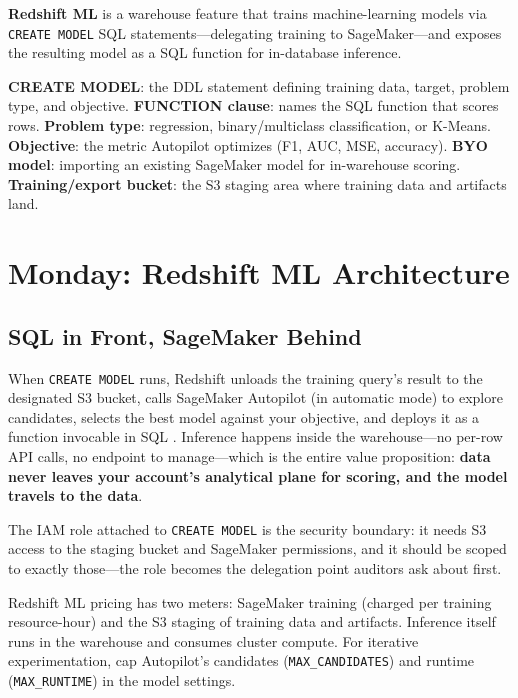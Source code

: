 \begin{definitionbox}
\textbf{Redshift ML} is a warehouse feature that trains machine-learning models via \texttt{CREATE MODEL} SQL statements---delegating training to SageMaker---and exposes the resulting model as a SQL function for in-database inference.
\end{definitionbox}

\begin{keyterms}
\textbf{CREATE MODEL}: the DDL statement defining training data, target, problem type, and objective. \textbf{FUNCTION clause}: names the SQL function that scores rows. \textbf{Problem type}: regression, binary/multiclass classification, or K-Means. \textbf{Objective}: the metric Autopilot optimizes (F1, AUC, MSE, accuracy). \textbf{BYO model}: importing an existing SageMaker model for in-warehouse scoring. \textbf{Training/export bucket}: the S3 staging area where training data and artifacts land.
\end{keyterms}

\section{Monday: Redshift ML Architecture}
\subsection{SQL in Front, SageMaker Behind}
When \texttt{CREATE MODEL} runs, Redshift unloads the training query's result to the designated S3 bucket, calls SageMaker Autopilot (in automatic mode) to explore candidates, selects the best model against your objective, and deploys it as a function invocable in SQL \cite{awsRedshiftMLDocs}. Inference happens inside the warehouse---no per-row API calls, no endpoint to manage---which is the entire value proposition: \textbf{data never leaves your account's analytical plane for scoring, and the model travels to the data}.

The IAM role attached to \texttt{CREATE MODEL} is the security boundary: it needs S3 access to the staging bucket and SageMaker permissions, and it should be scoped to exactly those---the role becomes the delegation point auditors ask about first.

\begin{notebox}
Redshift ML pricing has two meters: SageMaker training (charged per training resource-hour) and the S3 staging of training data and artifacts. Inference itself runs in the warehouse and consumes cluster compute. For iterative experimentation, cap Autopilot's candidates (\texttt{MAX\_CANDIDATES}) and runtime (\texttt{MAX\_RUNTIME}) in the model settings.
\end{notebox}

